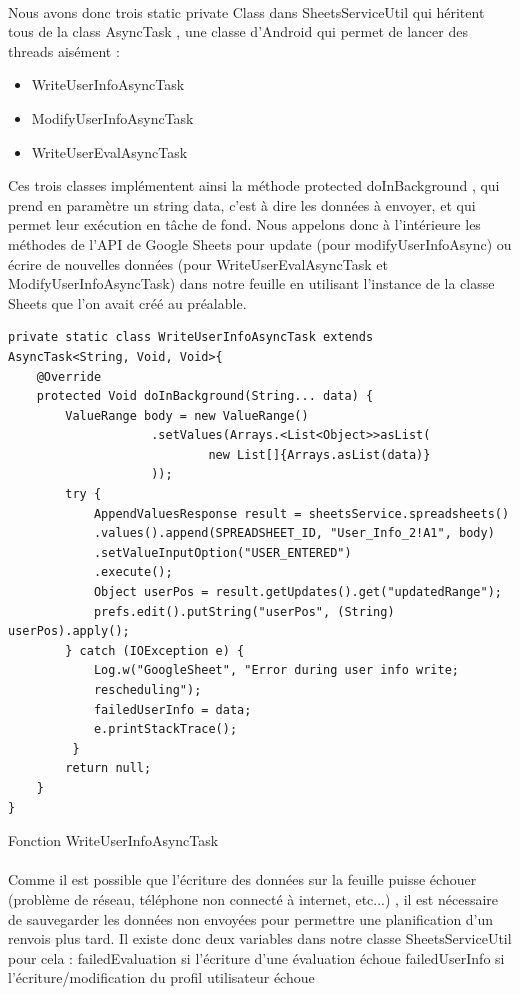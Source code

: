 \documentclass[a4paper, 11pt]{article}
\begin{document}
\paragraph{}
Nous avons donc trois static private Class dans SheetsServiceUtil qui héritent tous de la class AsyncTask , une classe d’Android qui permet de lancer des threads aisément : 
 \begin{itemize}
\item WriteUserInfoAsyncTask
\item ModifyUserInfoAsyncTask
\item WriteUserEvalAsyncTask
\end{itemize}
Ces trois classes implémentent ainsi la méthode protected doInBackground , qui prend en paramètre un string data, c’est à dire les données à envoyer, et qui permet leur exécution en tâche de fond.
Nous appelons donc à l'intérieure les méthodes de l’API de Google Sheets pour update (pour modifyUserInfoAsync) 
ou écrire de nouvelles données (pour WriteUserEvalAsyncTask et ModifyUserInfoAsyncTask) dans notre feuille en utilisant l’instance de la classe Sheets que l’on avait créé au préalable.
\hfill \break 
\begin{lstlisting}[tabsize=3]
private static class WriteUserInfoAsyncTask extends 
AsyncTask<String, Void, Void>{
	@Override
	protected Void doInBackground(String... data) {
		ValueRange body = new ValueRange()
                    .setValues(Arrays.<List<Object>>asList(
                            new List[]{Arrays.asList(data)}
                    ));
		try {
			AppendValuesResponse result = sheetsService.spreadsheets()
			.values().append(SPREADSHEET_ID, "User_Info_2!A1", body)
			.setValueInputOption("USER_ENTERED")
			.execute();
			Object userPos = result.getUpdates().get("updatedRange");
			prefs.edit().putString("userPos", (String) userPos).apply();
		} catch (IOException e) {
			Log.w("GoogleSheet", "Error during user info write; 
			rescheduling");
			failedUserInfo = data;
			e.printStackTrace();
		 }
		return null;
	}
}
\end{lstlisting}
Fonction WriteUserInfoAsyncTask
\paragraph{}
Comme il est possible que l’écriture des données sur la feuille puisse échouer (problème de réseau, téléphone non connecté à internet, etc...) , il est nécessaire de sauvegarder les données non envoyées pour permettre une planification d’un renvois plus tard. Il existe donc deux variables dans notre classe SheetsServiceUtil pour cela : 
failedEvaluation si l’écriture d’une évaluation échoue
failedUserInfo si l’écriture/modification du profil utilisateur échoue
\end{document}
